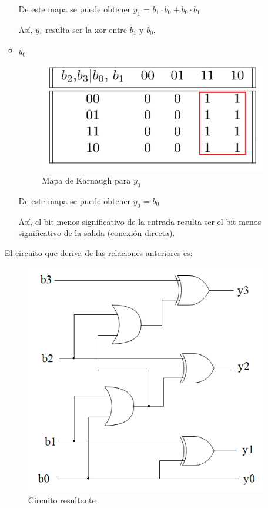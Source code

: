 \documentclass[../../informe/src/main.tex]{subfiles}
\begin{document}
\begin{enumerate}
\begin{itemize}
De este mapa se puede obtener $y_1$ = $\overline{b_{1}} \cdot b_{0}  + \overline{b_{0}} \cdot b_{1}$ 
\par
Así, $y_1$ resulta ser la xor entre $b_{1}$ y $b_{0}$.

\item $y_0$					


\begin{figure}[H]	%
	\centering
	\includegraphics[scale=0.4]{imagenes/karnaugh_mapa_y0.png}
	\caption{Mapa de Karnaugh para $y_0$}
	\label{fig:ej4_karnaugh_mapa_y0}
\end{figure}

De este mapa se puede obtener $y_0$ = $b_{0} $ 
\par
Así, el bit menos significativo de la entrada resulta ser el bit menos significativo de la salida (conexión directa).\par

\end{itemize} 

El circuito que deriva de las relaciones anteriores es:

\begin{figure}[H]	%
	\centering
	\includegraphics[scale=0.8]{imagenes/circuito_ej4.png}
	\caption{Circuito resultante}
	\label{fig:ej4_circuito_ej4}
\end{figure}

\end{enumerate}
 	
\end{document}
